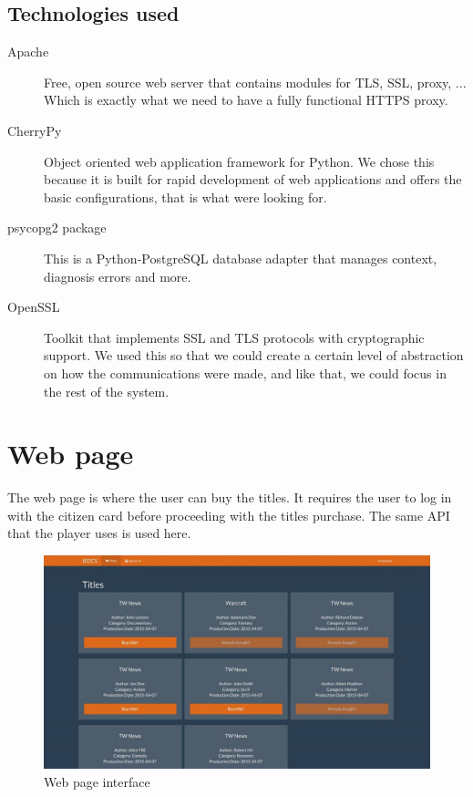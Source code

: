 \documentclass[11pt,a4paper]{report}
\begin{document}
\subsection{Technologies used}
\begin{description}
  \item[Apache] Free, open source web server that contains modules for TLS, SSL, proxy, ... Which is exactly what we need to have a fully functional HTTPS proxy.
  \item[CherryPy] Object oriented web application framework for Python. We chose this because it is built for rapid development of web applications and offers the basic configurations, that is what were looking for.
  \item[psycopg2 package] This is a Python-PostgreSQL database adapter that manages context, diagnosis errors and more.
  \item[OpenSSL] Toolkit that implements SSL and TLS protocols with cryptographic support. We used this so that we could create a certain level of abstraction on how the communications were made, and like that, we could focus in the rest of the system.
\end{description}

\section{Web page}
The web page is where the user can buy the titles.
It requires the user to log in with the citizen card before proceeding with the titles purchase.
The same API that the player uses is used here.

\begin{figure}[H]
\centerline{\includegraphics[width=500pt]{images/webpage.jpg}}
\caption{Web page interface}
\label{webpage}
\end{figure}
\end{document}
